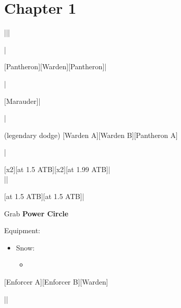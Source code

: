 \section{Chapter 1}

\begin{mainlist}
	\item {}
	\item {}
		|\skip||\skip
	\item \skip|\skip
	\item {}
		[Pantheron]\to{}[Warden]\to{}[Pantheron]|\skip
	\item \skip|\skip
	\item {}
		[Marauder]\to{}|
	\item \skip|\skip
	\item {} (legendary dodge)
		[Warden A]\to{}[Warden B]\to{}[Pantheron A]
	\item \skip|\skip
	\item {}
		\to{}[x2]\to{}[at 1.5 ATB]\to{}[x2]\to{}[at 1.99 ATB]\to{}|\skip\\|\save|\skip
	\item {}
		[at 1.5 ATB]\to{}\to{}\to{}[at 1.5 ATB]\to{}\to{}\to{}|
	\item Grab \textbf{Power Circle}
\end{mainlist}

\begin{menu}
	\item Equipment:
	\begin{itemize}
		\item Snow:
		\begin{itemize}
			\item {}
		\end{itemize}
	\end{itemize}
\end{menu}

\begin{mainlist}
	\item \skip
	\item {}
		[Enforcer A]\to{}[Enforcer B]\to{}[Warden]
	\item {}|\skip|\save
\end{mainlist}
